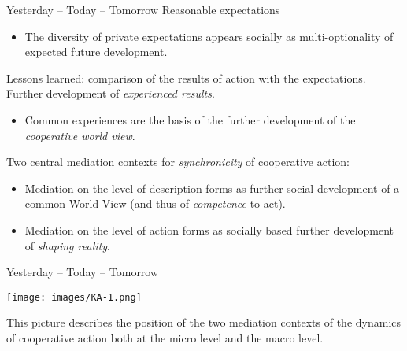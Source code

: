 \documentclass{beamer}
\begin{document}
\begin{frame}{Yesterday -- Today -- Tomorrow}
Reasonable expectations\vspace{-1em}
\begin{itemize}
\item The diversity of private expectations appears socially as
  multi-optionality of expected future development.
\end{itemize}\vspace{-1em}
Lessons learned: comparison of the results of action with the expectations.
Further development of \emph{experienced results}.
\begin{itemize}\vspace{-1em}
\item Common experiences are the basis of the further development of the
  \emph{cooperative world view}.
\end{itemize}\vspace{-1em}
Two central mediation contexts for \emph{synchronicity} of cooperative action:
\begin{itemize}\vspace{-1em}
\item Mediation on the level of description forms as further social
  development of a common World View (and thus of \emph{competence} to act).
\item Mediation on the level of action forms as socially based further
  development of \emph{shaping reality}.
\end{itemize}
\end{frame}

\begin{frame}{Yesterday -- Today -- Tomorrow}

  \begin{center}
    \texttt{[image: images/KA-1.png]}
  \end{center}
  
This picture describes the position of the two mediation contexts of the
dynamics of cooperative action both at the micro level and the macro level.
\end{frame}
\end{document}

